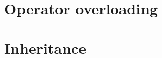 \documentclass[openany]{book}
\begin{document}
% 

%  

% 

% 

\chapter{Operator overloading}


\chapter{Inheritance}


% 

% 

% 

% 

% 

\end{document}
